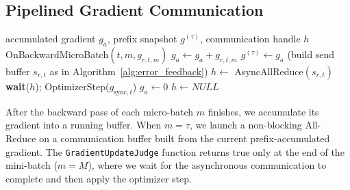 \subsection{Pipelined Gradient Communication}

\begin{algorithm}[tb]
  \caption{POLAR-SGD: Prefix-based pipelined gradient communication (one All-Reduce per iteration)}
  \label{alg:communication}
  \begin{algorithmic}
     accumulated gradient $g_a$, prefix snapshot $g^{(\tau)}$, communication handle $h$
     OnBackwardMicroBatch$(t,m,g_{r,t,m})$
    \STATE $g_a \leftarrow g_a + g_{r,t,m}$  
      \STATE $g^{(\tau)} \leftarrow g_a$  
      \STATE (build send buffer $s_{r,t}$ as in Algorithm~\ref{alg:error_feedback})
      \STATE $h \leftarrow$ AsyncAllReduce$(s_{r,t})$
    \ENDIF
      \STATE \textbf{wait}($h$); \hfill {}
      \STATE OptimizerStep($g_{\mathrm{sync},t}$)
      \STATE $g_a \leftarrow 0$
      \STATE $h \leftarrow NULL$
    \ENDIF
  \end{algorithmic}
\end{algorithm}


After the backward pass of each micro-batch $m$ finishes, we accumulate its gradient into a running buffer. When $m=\tau$, we launch a non-blocking All-Reduce on a communication buffer built from the current prefix-accumulated gradient. The \texttt{GradientUpdateJudge} function returns true only at the end of the mini-batch ($m=M$), where we wait for the asynchronous communication to complete and then apply the optimizer step.

